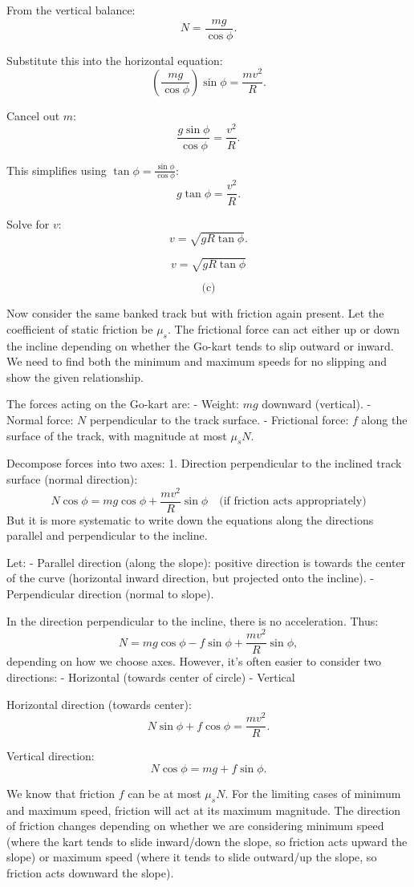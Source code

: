 \documentclass{article}
\begin{document}
From the vertical balance:
\[
N = \frac{mg}{\cos\phi}.
\]

Substitute this into the horizontal equation:
\[
\left(\frac{mg}{\cos\phi}\right) \sin\phi = \frac{mv^2}{R}.
\]

Cancel out \(m\):
\[
\frac{g \sin\phi}{\cos\phi} = \frac{v^2}{R}.
\]

This simplifies using \(\tan\phi = \frac{\sin\phi}{\cos\phi}\):
\[
g \tan\phi = \frac{v^2}{R}.
\]

Solve for \(v\):
\[
v = \sqrt{g R \tan\phi}.
\]

\[
\boxed{v = \sqrt{g R \tan\phi}}
\]

\[
\text{(c)}
\]

Now consider the same banked track but with friction again present. Let the coefficient of static friction be \(\mu_s\). The frictional force can act either up or down the incline depending on whether the Go-kart tends to slip outward or inward. We need to find both the minimum and maximum speeds for no slipping and show the given relationship.

The forces acting on the Go-kart are:
- Weight: \(mg\) downward (vertical).
- Normal force: \(N\) perpendicular to the track surface.
- Frictional force: \(f\) along the surface of the track, with magnitude at most \(\mu_s N\).

Decompose forces into two axes:
1. Direction perpendicular to the inclined track surface (normal direction):
\[
N \cos\phi = mg \cos\phi + \frac{mv^2}{R}\sin\phi \quad \text{(if friction acts appropriately)}
\]
But it is more systematic to write down the equations along the directions parallel and perpendicular to the incline.

Let:
- Parallel direction (along the slope): positive direction is towards the center of the curve (horizontal inward direction, but projected onto the incline).
- Perpendicular direction (normal to slope).

In the direction perpendicular to the incline, there is no acceleration. Thus:
\[
N = mg \cos\phi - f \sin\phi + \frac{mv^2}{R}\sin\phi,
\]
depending on how we choose axes. However, it's often easier to consider two directions:
- Horizontal (towards center of circle)
- Vertical

Horizontal direction (towards center):
\[
N \sin\phi + f \cos\phi = \frac{mv^2}{R}.
\]

Vertical direction:
\[
N \cos\phi = mg + f \sin\phi.
\]

We know that friction \(f\) can be at most \(\mu_s N\). For the limiting cases of minimum and maximum speed, friction will act at its maximum magnitude. The direction of friction changes depending on whether we are considering minimum speed (where the kart tends to slide inward/down the slope, so friction acts upward the slope) or maximum speed (where it tends to slide outward/up the slope, so friction acts downward the slope).
\end{document}
